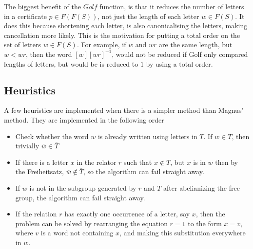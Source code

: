 \documentclass[12pt]{article} %
\theoremstyle{definition}
\theoremstyle{definition}
\theoremstyle{definition}
\theoremstyle{definition}
\theoremstyle{definition}
\theoremstyle{definition}
\begin{document}
The biggest benefit of the $Golf$ function, is that it reduces the number
of letters in a certificate $p \in F(F(S))$, not just the length of each letter
$w \in F(S)$. It does this because shortening each letter, is also
canonicalising the letters, making cancellation more likely. This is the motivation
for putting a total order on the set of letters $w \in F(S)$.
For example, if $w$ and $wr$ are the same length, but $w < wr$, then
the word $[w][wr]^{-1}$, would not be reduced if Golf only compared lengths of letters,
but would be is reduced to $1$ by using a total order.




\subsection{Heuristics}

A few heuristics are implemented when there is a simpler method than Magnus' method.
They are implemented in the following order

\begin{itemize}
  \item Check whether the word $w$ is already written using letters in $T$. If $w \in T$,
  then trivially $\overline{w} \in \overline{T}$

  \item If there is a letter $x$ in the relator $r$ such that $x \notin T$, but
  $x$ is in $w$ then by the Freiheitsatz, $\overline{w} \notin \overline{T}$,
  so the algorithm can fail straight away.

  \item If $w$ is not in the subgroup generated by $r$ and $T$ after abelianizing the free
    group, the algorithm can fail straight away.

  \item If the relation $r$ has exactly one occurrence of a letter, say $x$, then
    the problem can be solved by rearranging the equation $r = 1$ to the form
    $x = v$, where $v$ is a word not containing $x$, and making this substitution everywhere
    in $w$.
\end{itemize}
\end{document}
